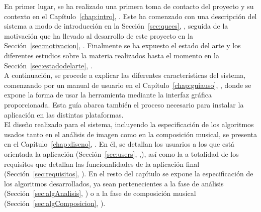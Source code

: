En primer lugar, se ha realizado una primera toma de contacto del proyecto y su contexto en el Capítulo~\ref{chap:intro}, \textit{}. Este ha comenzado con una descripción del sistema a modo de introducción en la Sección~\ref{sec:quees}, \textit{}, seguida de la motivación que ha llevado al desarrollo de este proyecto en la Sección~\ref{sec:motivacion}, \textit{}. Finalmente se ha expuesto el estado del arte y los diferentes estudios sobre la materia realizados hasta el momento en la Sección~\ref{sec:estadodelarte}, \textit{}.\\

A continuación, se procede a explicar las diferentes características del sistema, comenzando por un manual de usuario en el Capítulo~\ref{chap:guiauso}, \textit{}, donde se expone la forma de usar la herramienta mediante la interfaz gráfica proporcionada. Esta guía abarca también el proceso necesario para instalar la aplicación en las distintas plataformas.\\

El diseño realizado para el sistema, incluyendo la especificación de los algoritmos usados tanto en el análisis de imagen como en la composición musical, se presenta en el Capítulo~\ref{chap:diseno}, \textit{}. En él, se detallan los usuarios a los que está orientada la aplicación (Sección~\ref{sec:users}, \textit{},), así como la a totalidad de los requisitos que detallan las funcionalidades de la aplicación final (Sección~\ref{sec:requisitos}, \textit{}). En el resto del capítulo se expone la especificación de los algoritmos desarrollados, ya sean pertenecientes a la fase de análisis (Sección~\ref{sec:algAnalisis}, \textit{}) o a la fase de composición musical (Sección~\ref{sec:algComposicion}, \textit{}).\\


